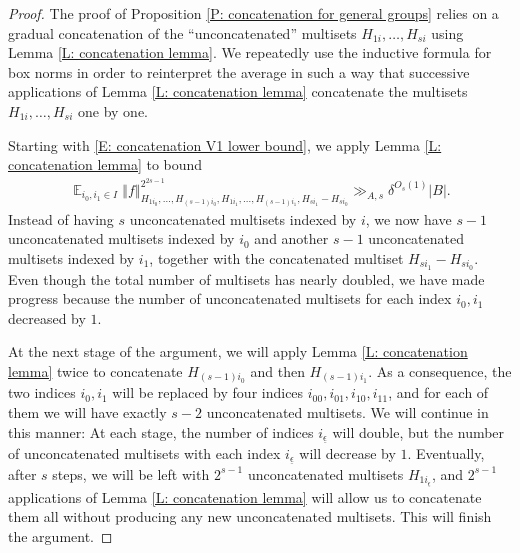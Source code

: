 \documentclass[11pt]{amsart}
\theoremstyle{definition}
\DeclareMathOperator*{\E}{\mathbb{E}}
\newcommand{\ueps}{{\underline{\epsilon}}}
\newcommand{\norm}[1]{\left\Vert #1\right\Vert}
\begin{document}
\begin{proof}
    The proof of Proposition \ref{P: concatenation for general groups} relies on a gradual concatenation of the ``unconcatenated'' multisets $H_{1i}, \ldots, H_{si}$ using Lemma \ref{L: concatenation lemma}. We repeatedly use the inductive formula for box norms in order to reinterpret the average in such a way  that successive applications of Lemma \ref{L: concatenation lemma} concatenate the multisets $H_{1i}, \ldots, H_{si}$ one by one. 

    

 Starting with \eqref{E: concatenation V1 lower bound}, we apply Lemma \ref{L: concatenation lemma} to bound
\begin{align}\label{E: concatenation s>2 1}
    \E_{i_0, i_1\in I}\norm{f}_{H_{1 i_0}, \ldots, H_{(s-1) i_0}, H_{1 i_1}, \ldots, H_{(s-1) i_1}, H_{s i_1}-H_{s i_0}}^{2^{2s-1}}\gg_{A, s} \delta^{O_s(1)}|B|.
\end{align}
Instead of having $s$ unconcatenated multisets indexed by $i$, we now have $s-1$ unconcatenated multisets indexed by $i_0$ and another $s-1$ unconcatenated multisets indexed by $i_1$, together with the concatenated multiset $H_{s i_1}-H_{s i_0}$. Even though the total number of multisets has nearly doubled, we have made progress because the number of unconcatenated multisets for each index $i_0, i_1$ decreased by $1$. 

At the next stage of the argument, we will apply Lemma \ref{L: concatenation lemma} twice to concatenate $H_{(s-1) i_0}$ and then $H_{(s-1) i_1}$. As a consequence, the two indices $i_0, i_1$ will be replaced by four indices $i_{00}, i_{01}, i_{10}, i_{11}$, and for each of them we will have exactly $s-2$ unconcatenated multisets. 
We will continue in this manner: At each stage, the number of indices $i_\ueps$ will double, but the number of unconcatenated multisets with each index $i_\ueps$ will decrease by $1$.
Eventually, after $s$ steps, we will be left with $2^{s-1}$ unconcatenated multisets $H_{1 i_\ueps}$, and $2^{s-1}$ applications of Lemma \ref{L: concatenation lemma} will allow us to concatenate them all without producing any new unconcatenated multisets. This will finish the argument.


\end{proof}
\end{document}
